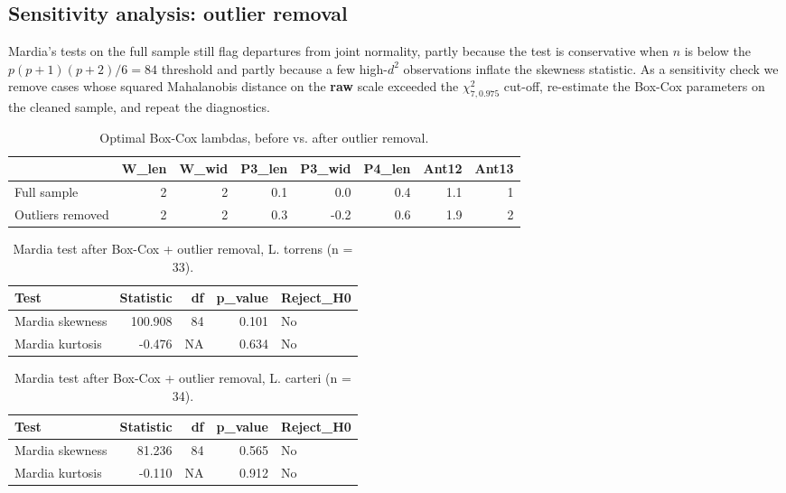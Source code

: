 \documentclass[
  11pt,
]{article}
\begin{document}
\subsection{Sensitivity analysis: outlier
removal}\label{sensitivity-analysis-outlier-removal}

Mardia's tests on the full sample still flag departures from joint
normality, partly because the test is conservative when \(n\) is below
the \(p(p+1)(p+2)/6 = 84\) threshold and partly because a few
high-\(d^2\) observations inflate the skewness statistic. As a
sensitivity check we remove cases whose squared Mahalanobis distance on
the \textbf{raw} scale exceeded the \(\chi^2_{7,0.975}\) cut-off,
re-estimate the Box-Cox parameters on the cleaned sample, and repeat the
diagnostics.

\begin{longtable}[t]{lrrrrrrr}
\caption{\label{tab:lambda-clean-tbl}Optimal Box-Cox lambdas, before vs. after outlier removal.}\\
\toprule
 & W\_len & W\_wid & P3\_len & P3\_wid & P4\_len & Ant12 & Ant13\\
\midrule
Full sample & 2 & 2 & 0.1 & 0.0 & 0.4 & 1.1 & 1\\
Outliers removed & 2 & 2 & 0.3 & -0.2 & 0.6 & 1.9 & 2\\
\bottomrule
\end{longtable}

\begin{longtable}[t]{lrrrl}
\caption{\label{tab:mardia-clean}Mardia test after Box-Cox + outlier removal, L. torrens (n = 33).}\\
\toprule
Test & Statistic & df & p\_value & Reject\_H0\\
\midrule
Mardia skewness & 100.908 & 84 & 0.101 & No\\
Mardia kurtosis & -0.476 & NA & 0.634 & No\\
\bottomrule
\end{longtable}

\begin{longtable}[t]{lrrrl}
\caption{\label{tab:mardia-clean}Mardia test after Box-Cox + outlier removal, L. carteri (n = 34).}\\
\toprule
Test & Statistic & df & p\_value & Reject\_H0\\
\midrule
Mardia skewness & 81.236 & 84 & 0.565 & No\\
Mardia kurtosis & -0.110 & NA & 0.912 & No\\
\bottomrule
\end{longtable}
\end{document}
